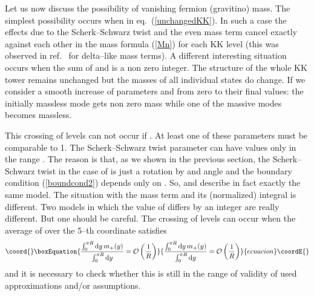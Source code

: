 \documentclass[a4paper,12pt]{article}
\def\al{\alpha}
\def\d{{\rm d}}
\def\ZZ{\mathbb Z}
\begin{document}
Let us now discuss the possibility of vanishing fermion (gravitino)
mass. The simplest possibility occurs when \coordHE{} in eq.\
(\ref{unchangedKK}). In such a case the effects due to the
Scherk--Schwarz twist and the even mass term cancel exactly against
each other in the mass formula (\ref{Mn}) for each KK 
level (this was observed in ref.\ \cite{Bagger:2001qi} for 
delta--like mass terms). A different
interesting situation occurs when the sum of \myHighlight{$\al$}\coordHE{} and \myHighlight{$\al_+$}\coordHE{} is a
non zero integer. The structure of the whole KK tower remains
unchanged but the masses of all individual states do change. If we
consider a smooth increase of parameters \myHighlight{$\al$}\coordHE{} and \myHighlight{$\al_+$}\coordHE{} from zero
to their final values: the initially massless mode gets non zero mass
while one of the massive modes becomes massless.


This crossing of levels can not occur if \myHighlight{$\al,\al_+\ll1$}\coordHE{}. At least one
of these parameters must be comparable to 1. The Scherk--Schwarz twist
parameter \myHighlight{$\al$}\coordHE{} can have values only in the range \myHighlight{$[-1/2,1/2]$}\coordHE{}. The
reason is that, as we shown in the previous section, the
Scherk--Schwarz twist in the case of \myHighlight{$S^1/\ZZ_2$}\coordHE{} is just a rotation by
and angle \myHighlight{$2\pi\al$}\coordHE{} and the boundary condition (\ref{boundcond2}) 
depends only on \myHighlight{$\tan(\pi\al)$}\coordHE{}. So, \myHighlight{$\al$}\coordHE{} and \myHighlight{$(\al+n)$}\coordHE{} describe in
fact exactly the same model. The situation with the mass term \myHighlight{$m_+(y)$}\coordHE{}
and its (normalized) integral \myHighlight{$\al_+$}\coordHE{} is different. Two models in
which the value of \myHighlight{$\al_+$}\coordHE{} differs by an integer are really
different. But one should be careful. The crossing of levels can
occur when the average of \myHighlight{$m_+(y)$}\coordHE{} over the 5--th coordinate satisfies
\begin{equation}\coord{}\boxEquation{
\frac{
\int_0^{\pi R}\d y\,m_+(y)}{\int_0^{\pi R}\d y}
={\cal O}\left(\frac{1}{R}\right)
}{
\frac{
\int_0^{\pi R}\d y\,m_+(y)}{\int_0^{\pi R}\d y}
={\cal O}\left(\frac{1}{R}\right)
}{ecuacion}\coordE{}\end{equation}
and it is necessary to check whether this is still in the range of
validity of used approximations and/or assumptions.




\end{document}
